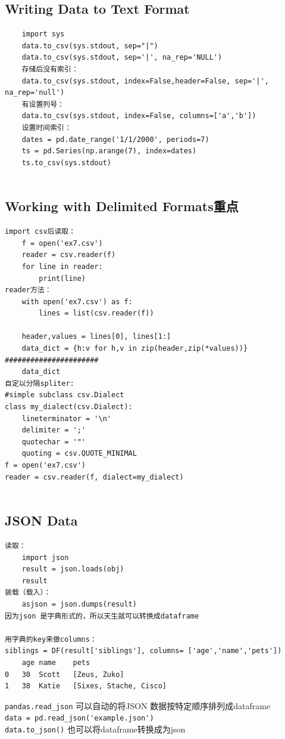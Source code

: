 \documentclass{article}
\begin{document}
\subsection{Writing Data to Text Format}
\begin{lstlisting}
	import sys
	data.to_csv(sys.stdout, sep="|")
	data.to_csv(sys.stdout, sep='|', na_rep='NULL')
	存储后没有索引：
	data.to_csv(sys.stdout, index=False,header=False, sep='|', na_rep='null')
	有设置列号：
	data.to_csv(sys.stdout, index=False, columns=['a','b'])
	设置时间索引：
	dates = pd.date_range('1/1/2000', periods=7)
	ts = pd.Series(np.arange(7), index=dates)
	ts.to_csv(sys.stdout)	
	
\end{lstlisting}


\subsection{Working with Delimited Formats重点}

\begin{lstlisting}
import csv后读取：
	f = open('ex7.csv')
	reader = csv.reader(f)
	for line in reader:
		print(line)
reader方法：	
	with open('ex7.csv') as f:
		lines = list(csv.reader(f))
	
	header,values = lines[0], lines[1:]
	data_dict = {h:v for h,v in zip(header,zip(*values))} ######################
	data_dict
自定以分隔spliter:	
#simple subclass csv.Dialect
class my_dialect(csv.Dialect):
	lineterminator = '\n'
	delimiter = ';'
	quotechar = '"'
	quoting = csv.QUOTE_MINIMAL
f = open('ex7.csv')
reader = csv.reader(f, dialect=my_dialect)	
	
\end{lstlisting}
\subsection{JSON Data}
\begin{lstlisting}
读取：
	import json
	result = json.loads(obj)
	result
装载（载入）：
	asjson = json.dumps(result)
因为json 是字典形式的，所以天生就可以转换成dataframe

用字典的key来做columns：
siblings = DF(result['siblings'], columns= ['age','name','pets'])
	age	name	pets
0	30	Scott	[Zeus, Zuko]
1	38	Katie	[Sixes, Stache, Cisco]
\end{lstlisting}

\verb|pandas.read_json| 可以自动的将JSON 数据按特定顺序排列成dataframe\\
\verb|data = pd.read_json('example.json')|\\
\verb|data.to_json()| 也可以将dataframe转换成为json\\
\end{document}
